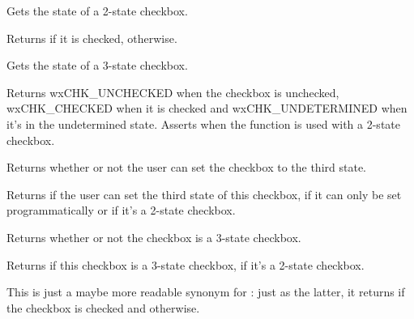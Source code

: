 \label{wxcheckboxgetvalue}


Gets the state of a 2-state checkbox.


Returns \true if it is checked, \false otherwise.

\label{wxcheckboxgetthreestatevalue}


Gets the state of a 3-state checkbox.


Returns wxCHK\_UNCHECKED when the checkbox is unchecked, wxCHK\_CHECKED
 when it is checked and wxCHK\_UNDETERMINED when it's in the undetermined
state. Asserts when the function is used with a 2-state checkbox.

\label{wxcheckboxis3rdstateallowedforuser}


Returns whether or not the user can set the checkbox to the third state.


Returns \true if the user can set the third state of this checkbox, \false if it can only be set
programmatically or if it's a 2-state checkbox.

\label{wxcheckboxis3state}


Returns whether or not the checkbox is a 3-state checkbox.


Returns \true if this checkbox is a 3-state checkbox, \false if it's a 2-state checkbox.

\label{wxcheckboxischecked}


This is just a maybe more readable synonym for 
: just as the latter, it returns 
\true if the checkbox is checked and \false otherwise.

\label{wxcheckboxsetvalue}


